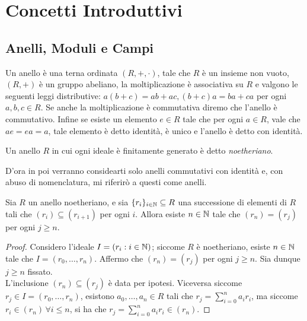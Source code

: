 \chapter{Concetti Introduttivi}

    \section{Anelli, Moduli e Campi}
        Un anello è una terna ordinata $(R,+,\cdot)$, tale che $R$ è un insieme non vuoto, $(R,+)$ è un gruppo abeliano, la moltiplicazione 
        è associativa su $R$ e valgono le seguenti leggi distributive: $a(b + c) = ab + ac, (b + c)a = ba + ca$ per ogni $a,b,c \in R$. Se 
        anche la moltiplicazione è commutativa diremo che l'anello è commutativo. Infine se esiste un elemento $e \in R$ tale che per ogni 
        $a \in R$, vale che $ae = ea = a$, tale elemento è detto identità, è unico e l'anello è detto con identità.
        \begin{comment}
            Un sottoinsieme $I \subseteq R$ si dice ideale se: è non vuoto, è un sottogruppo per la somma e per ogni $a \in I, r \in R, ar \in I$  
        e si indica con $I \ideal R$. Sia $a \in R$, si indica con $(a)$ l'ideale principale generato da $a$, ed è definito come $(a) = \{ar : 
        r \in R\}$. Si dice che gli elementi $r_1,\ldots,r_n \in R$ generano l'ideale $I$ e si scrive $I = (r_1,\ldots,r_n)$ se per ogni $a \in 
        I$ esistono $a_1,\ldots,a_n \in R$ tali che $a = \sum_{i=1}^n a_ir_i$.
        \end{comment}
        \begin{definizione}
            Un anello $R$ in cui ogni ideale è finitamente generato è detto \emph{noetheriano}.
        \end{definizione}
        D'ora in poi verranno considearti solo anelli commutativi con identità e, con abuso di nomenclatura, mi riferirò a questi come anelli.
        \begin{esercizio}\label{ex:noet-ring}
            Sia $R$ un anello noetheriano, e sia $\{r_i\}_{i \in \mathbb{N}} \subseteq R$ una successione di elementi di $R$ tali che $(r_i) \subseteq 
            (r_{i+1})$ per ogni $i$. Allora esiste $n \in \mathbb{N}$ tale che $(r_n) = (r_j)$ per ogni $j \geq n$.
        \end{esercizio}
        \begin{proof}
            Considero l'ideale $I = (r_i : i \in \mathbb{N})$; siccome $R$ è noetheriano, esiste $n \in \mathbb{N}$ tale che $I = (r_0,\ldots,r_n)$. Affermo che $(r_n) = 
            (r_j)$ per ogni $j \geq n$. Sia dunque $j \geq n$ fissato. \\
            L'inclusione $(r_n) \subseteq (r_j)$ è data per ipotesi. Viceversa siccome $r_j \in I = (r_0,\ldots,r_n)$, esistono $a_0,\ldots,a_n \in R$ tali 
            che $r_j = \sum_{i=0}^n a_ir_i$, ma siccome $r_i \in (r_n) \, \forall i \leq n$, si ha che $r_j = \sum_{i=0}^n a_ir_i \in (r_n)$.
        \end{proof}
